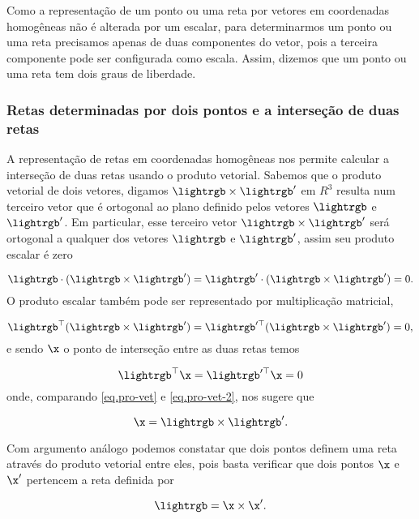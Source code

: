 Como a representação de um ponto ou uma reta por vetores em coordenadas homogêneas não é alterada por um escalar,  para determinarmos um ponto ou uma reta precisamos apenas de duas componentes do vetor, pois a terceira componente pode ser configurada como escala. Assim, dizemos que um ponto ou uma reta tem dois graus de liberdade.
\\

\subsubsection{Retas determinadas por dois pontos e a interseção de duas retas}

A representação de retas em coordenadas homogêneas nos permite calcular a interseção de duas retas usando o produto vetorial. Sabemos que o produto vetorial de dois vetores, digamos $\lightrgb\times\lightrgb'$ em $R^3$ resulta num terceiro vetor que é ortogonal ao plano definido pelos vetores $\lightrgb$ e $\lightrgb'$. Em particular, esse terceiro vetor $\lightrgb\times\lightrgb'$ será ortogonal a qualquer dos vetores $\lightrgb$ e $\lightrgb'$, assim seu produto escalar é zero

\begin{equation*}
\lightrgb\cdot(\lightrgb\times\lightrgb')=\lightrgb'\cdot(\lightrgb\times\lightrgb')=0.
\end{equation*}
O produto escalar também pode ser representado por multiplicação matricial,

\begin{equation}\label{eq.pro-vet}
\lightrgb^\top(\lightrgb\times\lightrgb')=\lightrgb'^\top(\lightrgb\times\lightrgb')=0,
\end{equation}
e sendo $\x$ o ponto de interseção entre as duas retas temos

\begin{equation}\label{eq.pro-vet-2}
\lightrgb^\top\x=\lightrgb'^\top\x=0
\end{equation}
onde, comparando \ref{eq.pro-vet} e \ref{eq.pro-vet-2}, nos sugere que

\begin{equation*}
\x=\lightrgb\times\lightrgb'.
\end{equation*}


Com argumento análogo podemos constatar que dois pontos definem uma reta através do produto vetorial entre eles, pois basta verificar que dois pontos $\x$ e $\x'$ pertencem a reta definida por

\begin{equation*}
\lightrgb=\x\times\x'.
\end{equation*}\\


